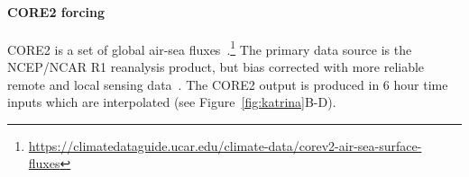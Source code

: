 \paragraph{CORE2 forcing}
CORE2 is a set of global air-sea fluxes~\cite{griffies2012datasets,large2009global,
 hurrell2008new}.\footnote{\url{https://climatedataguide.ucar.edu/climate-data/corev2-air-sea-surface-fluxes}}
 The primary data source is the NCEP/NCAR R1 reanalysis product,
 but bias corrected with more reliable remote and local sensing data~\cite{core2, core2expert}.
 The CORE2 output is produced in 6 hour time inputs which are interpolated
 (see Figure~\ref{fig:katrina}B-D).


